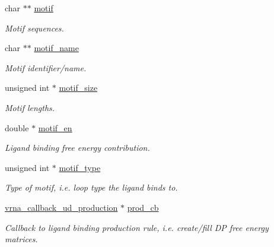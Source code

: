 \begin{DoxyCompactItemize}
char $\ast$$\ast$ \mbox{\hyperlink{group__domains__up_af285436bbdea4436ad2cedec65d48c75}{motif}}
\begin{DoxyCompactList}\small\item\em Motif sequences. \end{DoxyCompactList}\item 
\mbox{\label{group__domains__up_ad061d55ef0b51d304c8dce88ebdbbf78}} 
char $\ast$$\ast$ \mbox{\hyperlink{group__domains__up_ad061d55ef0b51d304c8dce88ebdbbf78}{motif\+\_\+name}}
\begin{DoxyCompactList}\small\item\em Motif identifier/name. \end{DoxyCompactList}\item 
\mbox{\label{group__domains__up_a6a9f89ab7d147eb0ffd6cf8d77d178c0}} 
unsigned int $\ast$ \mbox{\hyperlink{group__domains__up_a6a9f89ab7d147eb0ffd6cf8d77d178c0}{motif\+\_\+size}}
\begin{DoxyCompactList}\small\item\em Motif lengths. \end{DoxyCompactList}\item 
\mbox{\label{group__domains__up_aae4f0a45419784fb7c244bce2781403d}} 
double $\ast$ \mbox{\hyperlink{group__domains__up_aae4f0a45419784fb7c244bce2781403d}{motif\+\_\+en}}
\begin{DoxyCompactList}\small\item\em Ligand binding free energy contribution. \end{DoxyCompactList}\item 
\mbox{\label{group__domains__up_a3f0c026cced369ff176a66b2820f2057}} 
unsigned int $\ast$ \mbox{\hyperlink{group__domains__up_a3f0c026cced369ff176a66b2820f2057}{motif\+\_\+type}}
\begin{DoxyCompactList}\small\item\em Type of motif, i.\+e. loop type the ligand binds to. \end{DoxyCompactList}\item 
\mbox{\hyperlink{group__domains__up_ga4fdfc02c1b660c07f2d887772f02a0a1}{vrna\+\_\+callback\+\_\+ud\+\_\+production}} $\ast$ \mbox{\hyperlink{group__domains__up_ac2656d57130ac56e85212836482cbe80}{prod\+\_\+cb}}
\begin{DoxyCompactList}\small\item\em Callback to ligand binding production rule, i.\+e. create/fill DP free energy matrices. \end{DoxyCompactList}\item 

\end{DoxyCompactItemize}
